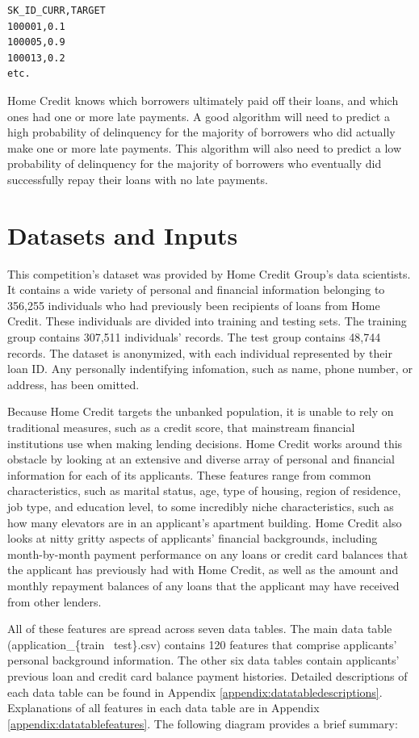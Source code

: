 \documentclass[12pt, letterpaper]{article}
\begin{document}
\begin{lstlisting}
SK_ID_CURR,TARGET
100001,0.1
100005,0.9
100013,0.2
etc.
\end{lstlisting}

Home Credit knows which borrowers ultimately paid off their loans, and which ones had one or more late payments. A good algorithm will need to predict a high probability of delinquency for the majority of borrowers who did actually make one or more late payments. This algorithm will also need to predict a low probability of delinquency for the majority of borrowers who eventually did successfully repay their loans with no late payments.

\section{Datasets and Inputs}
This competition's dataset was provided by Home Credit Group's data scientists. It contains a wide variety of personal and financial information belonging to 356,255 individuals who had previously been recipients of loans from Home Credit. These individuals are divided into training and testing sets. The training group contains 307,511 individuals' records. The test group contains 48,744 records. The dataset is anonymized, with each individual represented by their loan ID. Any personally indentifying infomation, such as name, phone number, or address, has been omitted.

Because Home Credit targets the unbanked population, it is unable to rely on traditional measures, such as a credit score, that mainstream financial institutions use when making lending decisions. Home Credit works around this obstacle by looking at an extensive and diverse array of personal and financial information for each of its applicants. These features range from common characteristics, such as marital status, age, type of housing, region of residence, job type, and education level, to some incredibly niche characteristics, such as how many elevators are in an applicant's apartment building. Home Credit also looks at nitty gritty aspects of applicants' financial backgrounds, including month-by-month payment performance on any loans or credit card balances that the applicant has previously had with Home Credit, as well as the amount and monthly repayment balances of any loans that the applicant may have received from other lenders.

All of these features are spread across seven data tables. The main data table (application_\{train \textbar~test\}.csv) contains 120 features that comprise applicants' personal background information. The other six data tables contain applicants' previous loan and credit card balance payment histories. Detailed descriptions of each data table can be found in Appendix \ref{appendix:datatabledescriptions}. Explanations of all features in each data table are in Appendix \ref{appendix:datatablefeatures}. The following diagram provides a brief summary:
\end{document}
